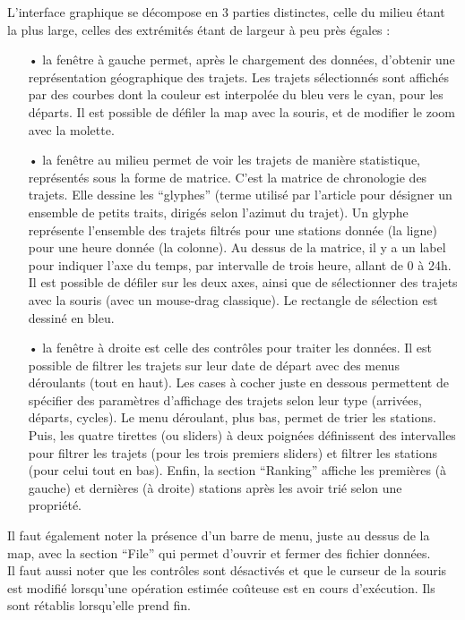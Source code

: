 \documentclass[12pt]{article}
\begin{document}
	\clearpage
	L’interface graphique se décompose en 3 parties distinctes, celle du milieu étant la plus large, celles des extrémités étant de largeur à peu près égales :\\

	\begin{itemize}
	\item[•] la fenêtre à gauche permet, après le chargement des données, d’obtenir une représentation géographique des trajets. Les trajets sélectionnés sont affichés par des courbes dont la couleur est interpolée du bleu vers le cyan, pour les départs. Il est possible de défiler la map avec la souris, et de modifier le zoom avec la molette.
	\item[•] la fenêtre au milieu permet de voir les trajets de manière statistique, représentés sous la forme de matrice. C’est la matrice de chronologie des trajets. Elle dessine les “glyphes” (terme utilisé par l’article pour désigner un ensemble de petits traits, dirigés selon l’azimut du trajet). Un glyphe représente l’ensemble des trajets filtrés pour une stations donnée (la ligne) pour une heure donnée (la colonne). Au dessus de la matrice, il y a un label pour indiquer l’axe du temps, par intervalle de trois heure, allant de 0 à 24h. Il est possible de défiler sur les deux axes, ainsi que de sélectionner des trajets avec la souris (avec un mouse-drag classique). Le rectangle de sélection est dessiné en bleu.
	\item[•] la fenêtre à droite est celle des contrôles pour traiter les données. Il est possible de filtrer les trajets sur leur date de départ avec des menus déroulants (tout en haut). Les cases à cocher juste en dessous permettent de spécifier des paramètres d’affichage des trajets selon leur type (arrivées, départs, cycles). Le menu déroulant, plus bas, permet de trier les stations. Puis, les quatre tirettes (ou sliders) à deux poignées définissent des intervalles pour filtrer les trajets (pour les trois premiers sliders) et filtrer les stations (pour celui tout en bas). Enfin, la section “Ranking” affiche les premières (à gauche) et dernières (à droite) stations après les avoir trié selon une propriété.\\
	\end{itemize}
	
	
	Il faut également noter la présence d’un barre de menu, juste au dessus de la map, avec la section “File” qui permet d’ouvrir et fermer des fichier données.\\

	Il faut aussi noter que les contrôles sont désactivés et que le curseur de la souris est modifié lorsqu’une opération estimée coûteuse est en cours d'exécution. Ils sont rétablis lorsqu’elle prend fin.\\
\end{document}
